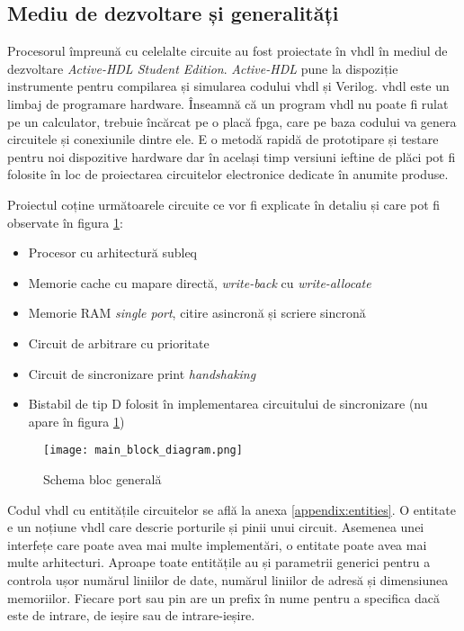 \documentclass[../main.tex]{subfiles}
\begin{document}
\subsection{Mediu de dezvoltare și generalități}
Procesorul împreună cu celelalte circuite au fost proiectate în \acrshort{vhdl} în mediul de dezvoltare
\emph{Active-HDL Student Edition}. \emph{Active-HDL} pune la dispoziție instrumente pentru compilarea și
simularea codului \acrshort{vhdl} și Verilog. \acrshort{vhdl} este un limbaj de programare hardware. Înseamnă
că un program \acrshort{vhdl} nu poate fi rulat pe un calculator, trebuie încărcat pe o placă \acrshort{fpga},
care pe baza codului va genera circuitele și conexiunile dintre ele. E o metodă rapidă de prototipare și testare
pentru noi dispozitive hardware dar în același timp versiuni ieftine de plăci pot fi folosite în loc de
proiectarea circuitelor electronice dedicate în anumite produse.

Proiectul coține următoarele circuite ce vor fi explicate în detaliu și care pot fi observate în figura 
\ref{fig:main_block_diagram}:
\begin{itemize}
    \item Procesor cu arhitectură \acrshort{subleq}
    \item Memorie cache cu mapare directă, \emph{write-back} cu \emph{write-allocate}
    \item Memorie RAM \emph{single port}, citire asincronă și scriere sincronă
    \item Circuit de arbitrare cu prioritate
    \item Circuit de sincronizare print \emph{handshaking}
    \item Bistabil de tip D folosit în implementarea circuitului de sincronizare (nu apare în figura \ref{fig:main_block_diagram})
\end{itemize}

\begin{figure}[h]
    \centering
    \texttt{[image: main\_block\_diagram.png]}
    \caption{Schema bloc generală}
    \label{fig:main_block_diagram}
\end{figure}

Codul \acrshort{vhdl} cu entitățile circuitelor se află la anexa \ref{appendix:entities}. O entitate e un noțiune \acrshort{vhdl}
care descrie porturile și pinii unui circuit. Asemenea unei interfețe care poate avea mai multe implementări, o entitate poate
avea mai multe arhitecturi. Aproape toate entitățile au și parametrii generici pentru a controla ușor numărul liniilor de date,
numărul liniilor de adresă și dimensiunea memoriilor. Fiecare port sau pin are un prefix în nume pentru a specifica dacă este
de intrare, de ieșire sau de intrare-ieșire.
\end{document}
